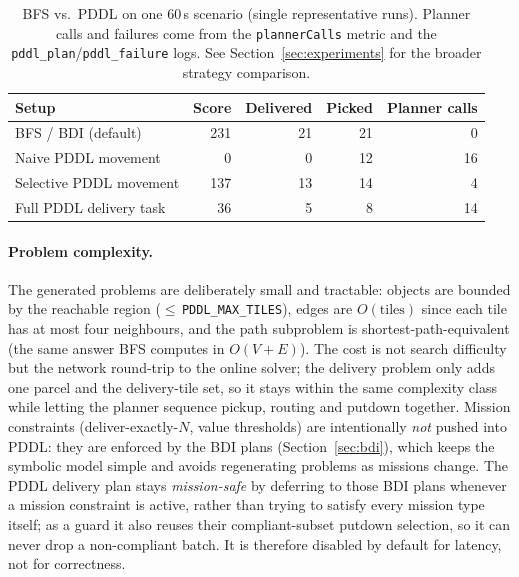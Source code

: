 \begin{table}[ht]
\centering\small
\begin{tabular}{@{}lrrrr@{}}
\toprule
Setup & Score & Delivered & Picked & Planner calls \\
\midrule
BFS / BDI (default)        & 231 & 21 & 21 & 0 \\
Naive PDDL movement        &   0 &  0 & 12 & 16 \\
Selective PDDL movement    & 137 & 13 & 14 & 4 \\
Full PDDL delivery task    &  36 &  5 &  8 & 14 \\
\bottomrule
\end{tabular}
\caption{BFS vs.\ PDDL on one $60$\,s scenario (single representative runs).
Planner calls and failures come from the \texttt{plannerCalls} metric and the
\texttt{pddl\_plan}/\texttt{pddl\_failure} logs. See Section~\ref{sec:experiments}
for the broader strategy comparison.}
\label{tab:pddl}
\end{table}

\paragraph{Problem complexity.} The generated problems are deliberately small
and tractable: objects are bounded by the reachable region ($\leq$\,\texttt{PDDL\_MAX\_TILES}),
edges are $O(\mathrm{tiles})$ since each tile has at most four neighbours, and the
path subproblem is shortest-path-equivalent (the same answer BFS computes in
$O(V{+}E)$). The cost is not search difficulty but the network round-trip to the
online solver; the delivery problem only adds one parcel and the delivery-tile
set, so it stays within the same complexity class while letting the planner
sequence pickup, routing and putdown together. Mission constraints
(deliver-exactly-$N$, value thresholds) are intentionally \emph{not} pushed into
PDDL: they are enforced by the BDI plans (Section~\ref{sec:bdi}), which keeps the
symbolic model simple and avoids regenerating problems as missions change. The
PDDL delivery plan stays \emph{mission-safe} by deferring to those BDI plans
whenever a mission constraint is active, rather than trying to satisfy every
mission type itself; as a guard it also reuses their compliant-subset putdown
selection, so it can never drop a non-compliant batch. It is therefore disabled
by default for latency, not for correctness.

